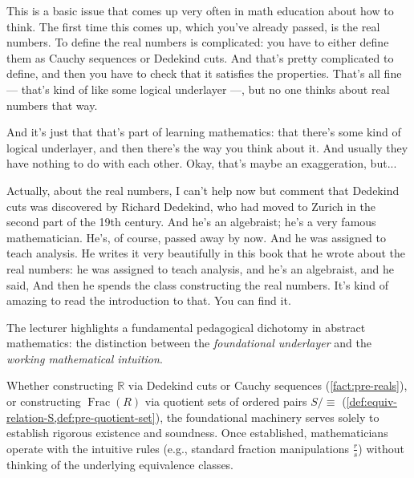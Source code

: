 \begin{speech}[00:03:25 - 00:04:45]
This is a basic issue that comes up very often in math education about how to think. The first time this comes up, which you've already passed, is the real numbers. To define the real numbers is complicated: you have to either define them as Cauchy sequences or Dedekind cuts. And that's pretty complicated to define, and then you have to check that it satisfies the properties. That's all fine --- that's kind of like some logical underlayer ---, but no one thinks about real numbers that way.

And it's just that that's part of learning mathematics: that there's some kind of logical underlayer, and then there's the way you think about it. And usually they have nothing to do with each other. Okay, that's maybe an exaggeration, but... 

Actually, about the real numbers, I can't help now but comment that Dedekind cuts was discovered by Richard Dedekind, who had moved to Zurich in the second part of the 19th century. And he's an algebraist; he's a very famous mathematician. He's, of course, passed away by now. And he was assigned to teach analysis. He writes it very beautifully in this book that he wrote about the real numbers: he was assigned to teach analysis, and he's an algebraist, and he said,  And then he spends the class constructing the real numbers. It's kind of amazing to read the introduction to that. You can find it.
\end{speech}

\begin{insight}
The lecturer highlights a fundamental pedagogical dichotomy in abstract mathematics: the distinction between the \emph{foundational underlayer} and the \emph{working mathematical intuition}. 

Whether constructing $\mathbb{R}$ via Dedekind cuts or Cauchy sequences (\cref{fact:pre-reals}), or constructing $\operatorname{Frac}(R)$ via quotient sets of ordered pairs $S / {\equiv}$ (\cref{def:equiv-relation-S,def:pre-quotient-set}), the foundational machinery serves solely to establish rigorous existence and soundness. Once established, mathematicians operate with the intuitive rules (e.g., standard fraction manipulations $\frac{r}{s}$) without thinking of the underlying equivalence classes.
\end{insight}

